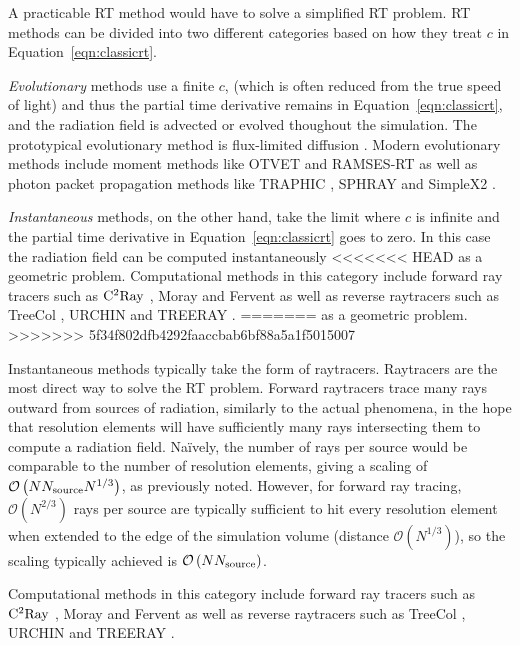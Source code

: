 \documentclass[fleq,usenatbib]{mnras}
\newcommand{\bigO}[1]{\mathcal{O}\left(#1\right)}
\newcommand{\NS}{N_{\rm source}}
\begin{document}
A practicable RT method would have to solve a simplified RT problem. RT 
methods can be divided into two different categories based on how they treat 
$c$ in Equation~\ref{eqn:classicrt}.

\textit{Evolutionary} methods use a 
finite $c$, (which is often reduced from the true speed of light) and thus the 
partial time derivative remains in Equation~\ref{eqn:classicrt}, and the 
radiation field is advected or evolved thoughout the simulation. The 
prototypical evolutionary method is flux-limited diffusion 
\citep{levermorePomraning81}. Modern evolutionary methods include 
moment methods like OTVET \citep{gnedinAbel01} and RAMSES-RT 
\citep{rosdahlEt13} as well as photon packet propagation methods like TRAPHIC 
\citep{pawlikSchaye08}, SPHRAY \citep{altayEt08} and SimpleX2 
\citep{paardekooperEt10}.

\textit{Instantaneous} methods,  on the other hand, take the limit where $c$ 
is infinite and the partial time derivative in Equation~\ref{eqn:classicrt} 
goes to zero. In this case the radiation field can be computed instantaneously 
<<<<<<< HEAD
as a geometric problem. Computational methods in this category include forward 
ray tracers such as $\rm C^2Ray$ \citep{mellemaEt06a}, Moray 
\citep{wiseAbel11} and Fervent \citep{baczynskiEt15} as well as reverse 
raytracers such as TreeCol \citep{clarkEt12}, URCHIN \citep{altayTheuns13} 
and TREERAY \citep{HaidEt18}. 
=======
as a geometric problem.
>>>>>>> 5f34f802dfb4292faaccbab6bf88a5a1f5015007

Instantaneous methods typically take the form of raytracers. Raytracers are 
the most direct way to solve the RT problem. Forward raytracers 
trace many rays outward from sources of radiation, similarly to the actual 
phenomena, in the hope that resolution elements will have sufficiently many 
rays intersecting them to compute a radiation field. Na\"ively, the number of 
rays per source would be comparable to the number of resolution elements, 
giving a scaling of $\bigO{N \NS N^{1/3}}$, as previously noted. However, for 
forward ray tracing, $\bigO{N^{2/3}}$ rays per source are typically sufficient 
to hit every resolution element when extended to the edge of the simulation 
volume (distance $\bigO{N^{1/3}}$), so the scaling typically achieved is 
$\bigO{N \NS}$.  

Computational methods in this category include forward 
ray tracers such as $\rm C^2Ray$ \citep{mellemaEt06a}, Moray 
\citep{wiseAbel11} and Fervent \citep{baczynskiEt15} as well as reverse 
raytracers such as TreeCol \citep{clarkEt12}, URCHIN \citep{altayTheuns13} and TREERAY \citep{HaidEt18}. 
\end{document}

